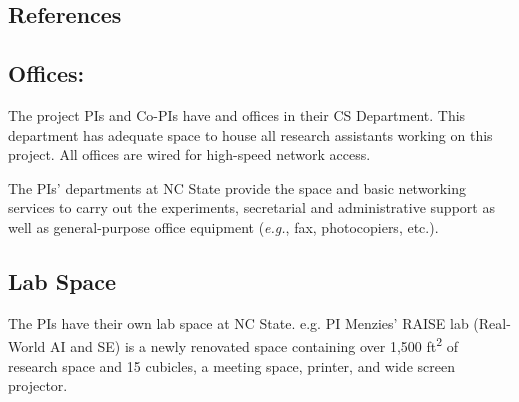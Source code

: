 \documentclass[twoside]{NSF}
\begin{document}
\begin{nsfreferences}
 \pagestyle{empty}
\section*{References}
      
\end{nsfreferences} 

\begin{nsffacilities}
  



 
     
\subsection*{Offices:}
The project PIs  and Co-PIs 
have  
and offices in their   CS Department. This department
has adequate space to house all research assistants
working on this project. All offices are wired for high-speed network access.

The PIs' departments at  NC State provide the space and basic networking services to
carry out the experiments, secretarial and administrative support as well as general-purpose office equipment ({\em e.g.}, fax, photocopiers, etc.).

\subsection*{Lab Space}
The PIs have their own lab space at NC State.
e.g. PI  Menzies' RAISE lab (Real-World 
AI and SE) is a newly renovated space containing over 1,500 ft\textsuperscript{2} of research space and 
15 cubicles, a meeting space, printer, and wide screen projector. 


\end{nsffacilities}
\end{document}
